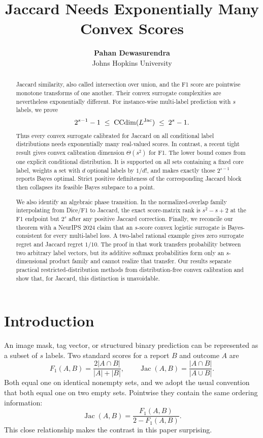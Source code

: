 \documentclass{article}
\title{Jaccard Needs Exponentially Many Convex Scores}
\author{\textbf{Pahan Dewasurendra} \\ Johns Hopkins University}
\newcommand{\1}{\mathbf 1}
\newcommand{\Jac}{\operatorname{Jac}}
\newcommand{\CCdim}{\operatorname{CCdim}}
\begin{document}
\maketitle

\begin{abstract}
Jaccard similarity, also called intersection over union, and the F1 score are pointwise monotone transforms of one another. Their convex surrogate complexities are nevertheless exponentially different. For instance-wise multi-label prediction with $s$ labels, we prove \[ 2^{s-1}-1 \;\leq\; \CCdim(L^{\rm Jac}) \;\leq\; 2^s-1. \] Thus every convex surrogate calibrated for Jaccard on all conditional label distributions needs exponentially many real-valued scores. In contrast, a recent tight result gives convex calibration dimension $\Theta(s^2)$ for F1. The lower bound comes from one explicit conditional distribution. It is supported on all sets containing a fixed core label, weights a set with $d$ optional labels by $1/d!$, and makes exactly those $2^{s-1}$ reports Bayes optimal. Strict positive definiteness of the corresponding Jaccard block then collapses its feasible Bayes subspace to a point.

We also identify an algebraic phase transition. In the normalized-overlap family interpolating from Dice/F1 to Jaccard, the exact score-matrix rank is $s^2-s+2$ at the F1 endpoint but $2^s$ after any positive Jaccard correction. Finally, we reconcile our theorem with a NeurIPS 2024 claim that an $s$-score convex logistic surrogate is Bayes-consistent for every multi-label loss. A two-label rational example gives zero surrogate regret and Jaccard regret $1/10$. The proof in that work transfers probability between two arbitrary label vectors, but its additive softmax probabilities form only an $s$-dimensional product family and cannot realize that transfer. Our results separate practical restricted-distribution methods from distribution-free convex calibration and show that, for Jaccard, this distinction is unavoidable.
\end{abstract}

\section{Introduction}

An image mask, tag vector, or structured binary prediction can be represented as a subset of $s$ labels. Two standard scores for a report $B$ and outcome $A$ are \[ F_1(A,B)=\frac{2|A\cap B|}{|A|+|B|}, \qquad \Jac(A,B)=\frac{|A\cap B|}{|A\cup B|}. \tag{1}\label{eq:scores} \] Both equal one on identical nonempty sets, and we adopt the usual convention that both equal one on two empty sets. Pointwise they contain the same ordering information: \[ \Jac(A,B)=\frac{F_1(A,B)}{2-F_1(A,B)}. \tag{2}\label{eq:monotone} \] This close relationship makes the contrast in this paper surprising.
\end{document}
